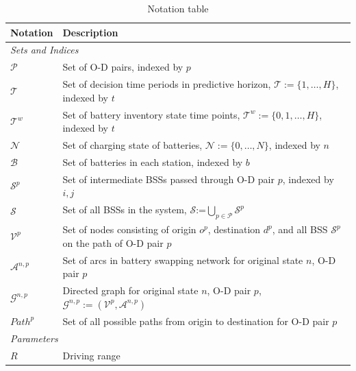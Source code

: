\documentclass[12pt,hyperref,a4paper,UTF8]{ctexart}
\begin{document}
\begin{table}[!htbp]
  \centering
  \caption{Notation table}
  \label{tab:notation}
  \footnotesize
  \setlength{\tabcolsep}{1pt}
  \renewcommand{\arraystretch}{0.85}
  \begin{tabular}{@{}lp{13cm}@{}}
    \toprule
    \textbf{Notation} & \textbf{Description} \\
    \midrule
    \multicolumn{2}{l}{\textit{Sets and Indices}} \\
    $\mathcal{P}$ & Set of O-D pairs, indexed by $p$\\
    $\mathcal{T}$ & Set of decision time periods in predictive horizon, $\mathcal{T}:=\{1,\dots,H\}$, indexed by $t$ \\
    $\mathcal{T}^{w}$ & Set of battery inventory state time points, $\mathcal{T}^{w}:=\{0,1,\dots,H\}$, indexed by $t$ \\
    $\mathcal{N}$ & Set of charging state of batteries, $\mathcal{N}:=\{0,\dots,N\}$, indexed by $n$\\
    $\mathcal{B}$ & Set of batteries in each station, indexed by $b$ \\
    $\mathcal{S}^p$ & Set of intermediate BSSs passed through O-D pair $p$, indexed by $i, j$ \\
    $\mathcal{S}$ & Set of all BSSs in the system, $\mathcal{S}$:=$\bigcup_{p \in \mathcal{P}}\mathcal{S}^p$\\
    $\mathcal{V}^p$ & Set of nodes consisting of origin $o^p$, destination $d^p$, and all BSS $\mathcal{S}^p$ on the path of O-D pair $p$ \\  
    $\mathcal{A}^{n,p}$ & Set of arcs in battery swapping network for original state $n$, O-D pair $p$ \\
    $\mathcal{G}^{n,p}$ & Directed graph for original state $n$, O-D pair $p$, $\mathcal{G}^{n,p}:=(\mathcal{V}^p,\mathcal{A}^{n,p})$ \\
    $Path^p$ & Set of all possible paths from origin to destination for O-D pair $p$ \\
    \midrule
    \multicolumn{2}{l}{\textit{Parameters}} \\
    $R$ & Driving range \\

\end{tabular}
\end{table}
\end{document}
